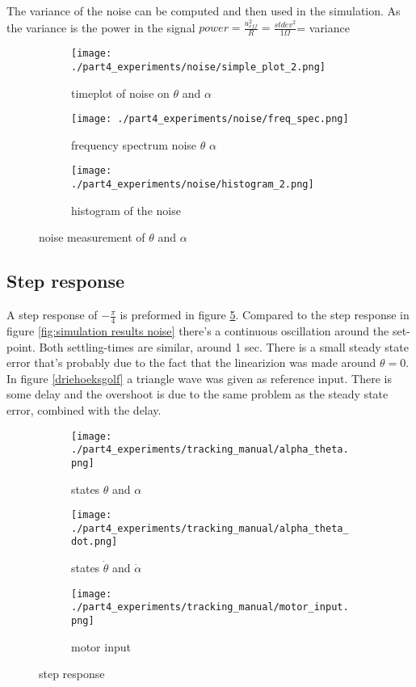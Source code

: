 	The variance of the noise can be computed and then used in the simulation. As the variance is the power in the signal $power = \frac{u_{eff}^2}{R} = \frac{stdev^2}{1 \Omega}$= variance
		
	\begin{figure}[H]
		\centering
		\begin{subfigure}[b]{0.30\textwidth}
			\texttt{[image: ./part4\_experiments/noise/simple\_plot\_2.png]}
			\caption{timeplot of noise on $\theta$ and $\alpha$}
			\label{fig:time noise}
		\end{subfigure}
		\begin{subfigure}[b]{0.30\textwidth}
			\texttt{[image: ./part4\_experiments/noise/freq\_spec.png]}
			\caption{frequency spectrum noise $\theta$ $\alpha$}
			\label{fig:freq noise}
		\end{subfigure}
		\begin{subfigure}[b]{0.30\textwidth}
			\texttt{[image: ./part4\_experiments/noise/histogram\_2.png]}
			\caption{histogram of the noise}
			\label{fig:hist noise}
		\end{subfigure}
		\caption{noise measurement of $\theta$ and $\alpha$}
	\end{figure}


\subsection{Step response}
	A step response of $-\frac{\pi}{4}$ is preformed in figure \ref{fig:step_1}. Compared to the step response in figure \ref{fig:simulation results noise} there's a continuous oscillation around the set-point. Both settling-times are similar, around 1 sec. There is a small steady state error that's probably due to the fact that the linearizion was made around $\theta = 0$. In figure \ref{driehoeksgolf} a triangle wave was given as reference input. There is some delay and the overshoot is due to the same problem as the steady state error, combined with the delay. 

	\begin{figure}[H]
		\centering
		\begin{subfigure}[b]{0.4\textwidth}
			\texttt{[image: ./part4\_experiments/tracking\_manual/alpha\_theta.png]}
			\caption{states $\theta$ and $\alpha$}
		\end{subfigure}
		\begin{subfigure}[b]{0.4\textwidth}
			\texttt{[image: ./part4\_experiments/tracking\_manual/alpha\_theta\_dot.png]}
			\caption{states $\dot{\theta}$ and $\dot{\alpha}$}
		\end{subfigure}
		\begin{subfigure}[b]{0.4\textwidth}
			\texttt{[image: ./part4\_experiments/tracking\_manual/motor\_input.png]}
			\caption{motor input}
		\end{subfigure}
		\caption{step response}
		\label{fig:step_1}
	\end{figure}
	
